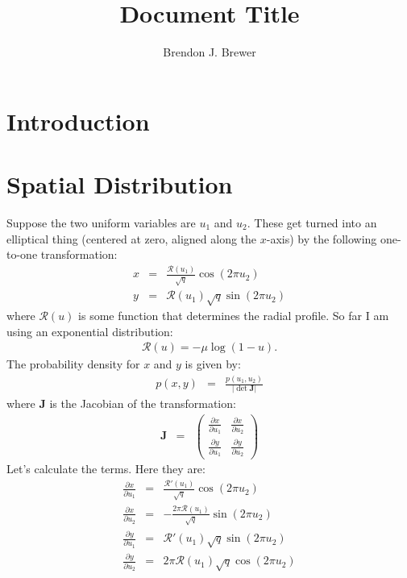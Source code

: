 \documentclass[letterpaper, 11pt]{article}
\title{Document Title}
\author{Brendon J. Brewer}
\begin{document}
\maketitle

\section{Introduction}

\section{Spatial Distribution}
Suppose the two uniform variables are $u_1$ and $u_2$.
These get turned into an elliptical thing 
(centered at zero, aligned along the $x$-axis)
by the following one-to-one transformation:
\begin{eqnarray}
x &=& \frac{\mathcal{R}(u_1)}{\sqrt{q}}\cos\left(2\pi u_2\right)\\
y &=& \mathcal{R}(u_1)\sqrt{q}\sin\left(2\pi u_2\right)
\end{eqnarray}
where $\mathcal{R}(u)$ is some function that determines the
radial profile. So far I am using an exponential distribution:
\begin{eqnarray}
\mathcal{R}(u) = -\mu\log(1 - u).
\end{eqnarray}
The probability density for $x$ and $y$ is given by:
\begin{eqnarray}
p(x, y)
&=& \frac{p(u_1, u_2)}{\left|\det \mathbf{J}\right|}
\end{eqnarray}
where $\mathbf{J}$ is the Jacobian of the transformation:
\begin{eqnarray}
\mathbf{J} &=&
\left(
\begin{array}{cc}
\frac{\partial x}{\partial u_1} & \frac{\partial x}{\partial u_2}\\
\frac{\partial y}{\partial u_1} & \frac{\partial y}{\partial u_2}
\end{array}
\right)
\end{eqnarray}
Let's calculate the terms. Here they are:
\begin{eqnarray}
\frac{\partial x}{\partial u_1} &=& \frac{\mathcal{R}'(u_1)}{\sqrt{q}}\cos\left(2\pi u_2\right)\\
\frac{\partial x}{\partial u_2} &=& -\frac{2\pi\mathcal{R}(u_1)}{\sqrt{q}}\sin\left(2\pi u_2\right)\\
\frac{\partial y}{\partial u_1} &=& \mathcal{R}'(u_1)\sqrt{q}\sin\left(2\pi u_2\right)\\
\frac{\partial y}{\partial u_2} &=&  2\pi\mathcal{R}(u_1)\sqrt{q}\cos\left(2\pi u_2\right)
\end{eqnarray}
\end{document}
